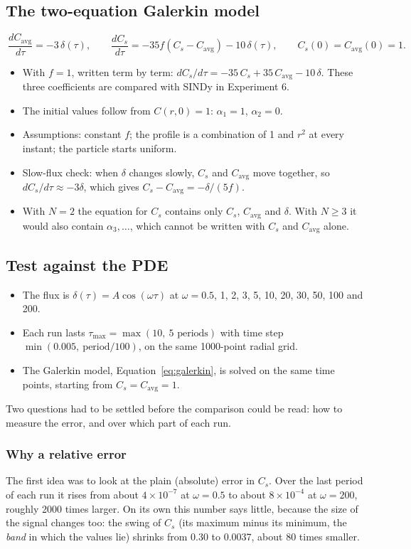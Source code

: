 \documentclass[11pt,a4paper]{article}
\newcommand{\avg}{\mathrm{avg}}
\begin{document}
\subsection{The two-equation Galerkin model}
\begin{equation}\label{eq:galerkin}
  \boxed{\ \frac{dC_\avg}{d\tau}=-3\,\delta(\tau),\qquad \frac{dC_s}{d\tau}=-35f\left(C_s-C_\avg\right)-10\,\delta(\tau),\qquad C_s(0)=C_\avg(0)=1.\ }
\end{equation}
\begin{itemize}
  \item With $f=1$, written term by term: $dC_s/d\tau=-35\,C_s+35\,C_\avg-10\,\delta$. These three coefficients are compared with SINDy in Experiment 6.
  \item The initial values follow from $C(r,0)=1$: $\alpha_1=1$, $\alpha_2=0$.
  \item Assumptions: constant $f$; the profile is a combination of 1 and $r^2$ at every instant; the particle starts uniform.
  \item Slow-flux check: when $\delta$ changes slowly, $C_s$ and $C_\avg$ move together, so $dC_s/d\tau\approx-3\delta$, which gives $C_s-C_\avg=-\delta/(5f)$.
  \item With $N=2$ the equation for $C_s$ contains only $C_s$, $C_\avg$ and $\delta$. With $N\ge3$ it would also contain $\alpha_3,\dots$, which cannot be written with $C_s$ and $C_\avg$ alone.
\end{itemize}

\subsection{Test against the PDE}\label{sec:exp5test}
\begin{itemize}
  \item The flux is $\delta(\tau)=A\cos(\omega\tau)$ at $\omega=0.5$, 1, 2, 3, 5, 10, 20, 30, 50, 100 and 200.
  \item Each run lasts $\tau_{\max}=\max(10,\ 5\text{ periods})$ with time step $\min(0.005,\ \text{period}/100)$, on the same 1000-point radial grid.
  \item The Galerkin model, Equation~\eqref{eq:galerkin}, is solved on the same time points, starting from $C_s=C_\avg=1$.
\end{itemize}
Two questions had to be settled before the comparison could be read: how to measure the error, and over which part of each run.

\subsubsection{Why a relative error}
The first idea was to look at the plain (absolute) error in $C_s$. Over the last period of each run it rises from about $4\times10^{-7}$ at $\omega=0.5$ to about $8\times10^{-4}$ at $\omega=200$, roughly 2000 times larger. On its own this number says little, because the size of the signal changes too: the swing of $C_s$ (its maximum minus its minimum, the \emph{band} in which the values lie) shrinks from 0.30 to 0.0037, about 80 times smaller.
\end{document}
